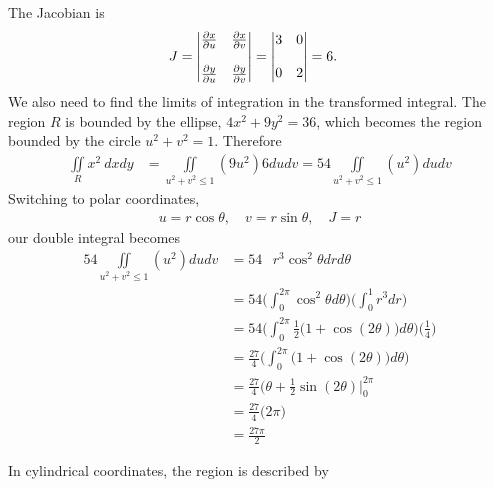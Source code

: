 \documentclass{article}
\begin{document}
\item %
The Jacobian is
\begin{align*}   J &=  
  \begin{vmatrix}
   \frac{\partial x}{\partial u} &  \frac{\partial x}{\partial v} \\ \\
   \frac{\partial y}{\partial u} & \frac{\partial y}{\partial v} \\
  \end{vmatrix}
  =     \begin{vmatrix}
   3 & 0 \\ \\
   0 & 2 \\
  \end{vmatrix}
  = 6 .
 \end{align*}
We also need to find the limits of integration in the transformed integral. The region $R$ is bounded by the ellipse, $4x^2 + 9y^2 = 36$, which becomes the region bounded by the circle $u^2 + v^2 = 1$. Therefore
\begin{align*}
  \iint\limits_R x^2 \ dxdy &= \iint\limits_{u^2 + v^2 \le 1} (9u^2) 6dudv =  54 \iint\limits_{u^2 + v^2 \le 1} (u^2) dudv
\end{align*}
Switching to polar coordinates, 
\begin{align*}
  u = r\cos\theta, \quad v = r\sin\theta, \quad J = r
\end{align*}
our double integral becomes
\begin{align*}
  54 \iint\limits_{u^2 + v^2 \le 1} (u^2) dudv 
  & = 54 \mathop{\int_0^{2\pi} \!\! \int_0^1} r^3\cos^2\theta drd\theta  \\
  & = 54 \Bigg( \int_0^{2\pi} \cos^2\theta d\theta \Bigg)\Bigg( \int_0^1 r^3 dr \Bigg) \\
  & = 54 \Bigg( \int_0^{2\pi} \frac{1}{2} \big(1+\cos(2\theta) \big) d\theta \Bigg) \Bigg( \frac{1}{4} \Bigg) \\
  & =\frac{27}{4} \Bigg( \int_0^{2\pi}  \big(1+\cos(2\theta) \big) d\theta \Bigg) \\
  & =\frac{27}{4} \big(\theta+\frac{1}{2}\sin(2\theta) \big|_0^{2\pi}  \\
  & =\frac{27}{4} \big(2\pi\big)  \\
  & =\frac{27\pi}{2} 
\end{align*}
\item %
In cylindrical coordinates, the region is described by 
\end{document}
